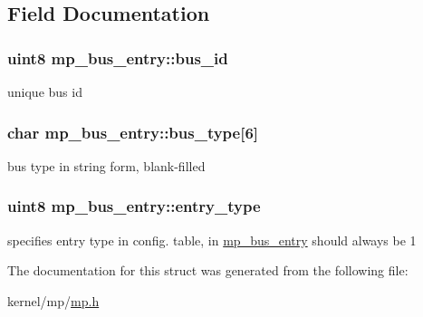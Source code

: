 \subsection{Field Documentation}
\hypertarget{structmp__bus__entry_abd8e48c419740a7c8dc96f0e34bad2fc}{
\subsubsection[{bus\_\-id}]{\setlength{\rightskip}{0pt plus 5cm}uint8 {\bf mp\_\-bus\_\-entry::bus\_\-id}}}
\label{structmp__bus__entry_abd8e48c419740a7c8dc96f0e34bad2fc}
unique bus id \hypertarget{structmp__bus__entry_a302b64734336c1fb7bd4376a032f9358}{
\subsubsection[{bus\_\-type}]{\setlength{\rightskip}{0pt plus 5cm}char {\bf mp\_\-bus\_\-entry::bus\_\-type}\mbox{[}6\mbox{]}}}
\label{structmp__bus__entry_a302b64734336c1fb7bd4376a032f9358}
bus type in string form, blank-\/filled \hypertarget{structmp__bus__entry_a8140c8c7b07812414d86746af40e9043}{
\subsubsection[{entry\_\-type}]{\setlength{\rightskip}{0pt plus 5cm}uint8 {\bf mp\_\-bus\_\-entry::entry\_\-type}}}
\label{structmp__bus__entry_a8140c8c7b07812414d86746af40e9043}
specifies entry type in config. table, in \hyperlink{structmp__bus__entry}{mp\_\-bus\_\-entry} should always be 1 

The documentation for this struct was generated from the following file:\begin{DoxyCompactItemize}
\item 
kernel/mp/\hyperlink{mp_8h}{mp.h}\end{DoxyCompactItemize}
